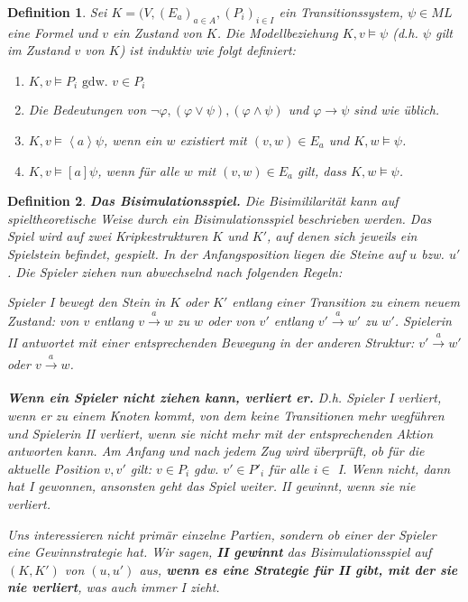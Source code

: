 \documentclass[12pt,a4paper]{article}
\newtheorem{defi}{Definition}[section]
\begin{document}
	\begin{defi}
	Sei $K = (V,(E_a)_{a\in A}, (P_i)_{i \in I}$ ein Transitionssystem,
$\psi \in ML$ eine Formel und $v$ ein Zustand von $K$. Die Modellbeziehung
$K, v \models \psi$ (d.h. $\psi$ gilt im Zustand $v$ von $K$) ist induktiv wie folgt definiert:
\begin{enumerate}
	\item $K,v \models P_i \text{ gdw. } v \in P_i$
	\item Die Bedeutungen von $\neg \varphi, (\varphi \lor \psi), (\varphi \land \psi)$ und $\varphi \rightarrow \psi $ sind wie üblich.
	\item $K,v \models \left\langle a \right\rangle \psi$, wenn ein $w$ existiert mit $(v,w) \in E_a$ und $K,w \models \psi$.
	\item $K,v \models \left[ a \right] \psi$, wenn für alle $w$ mit $(v,w) \in E_a$ gilt, dass $K,w \models \psi$.

\end{enumerate}
	\end{defi}
	
	\begin{defi}
	 \textbf{Das Bisimulationsspiel.} Die Bisimililarität kann auf spieltheoretische Weise durch ein Bisimulationsspiel beschrieben werden. Das Spiel wird auf zwei Kripkestrukturen
$K$ und $K'$, auf denen sich jeweils ein Spielstein befindet, gespielt. In der Anfangsposition liegen die Steine auf $u$ bzw. $u'$. Die Spieler ziehen nun abwechselnd nach folgenden Regeln:

Spieler I bewegt den Stein in $K$ oder $K'$ 
entlang einer Transition
zu einem neuem Zustand: von $v$ entlang $v \xrightarrow[]{a} w$ zu $w$ oder 
von $v'$ entlang $v' \xrightarrow[]{a} w'$ zu $w'$. 
Spielerin II antwortet mit einer entsprechenden
Bewegung in der anderen Struktur: $v' \xrightarrow[]{a} w'$ oder 
$v \xrightarrow[]{a} w$.

\textbf{Wenn ein Spieler nicht ziehen kann, verliert er.} D.h. Spieler I verliert, wenn er zu
einem Knoten kommt, von dem keine Transitionen mehr wegführen und
Spielerin II verliert, wenn sie nicht mehr mit der entsprechenden Aktion
antworten kann. Am Anfang und nach jedem Zug wird überprüft, ob
für die aktuelle Position $v, v'$ gilt: $v \in P_i$ gdw. $v' \in P'_i$
für alle $i \in $ I.
Wenn nicht, dann hat I gewonnen, ansonsten geht das Spiel weiter. II
gewinnt, wenn sie nie verliert.

Uns interessieren nicht primär einzelne Partien, sondern ob einer
der Spieler eine Gewinnstrategie hat. Wir sagen, \textbf{II gewinnt} das Bisimulationsspiel
auf $(K, K')$ von $(u, u')$ aus, \textbf{wenn es eine Strategie für
II gibt, mit der sie nie verliert}, was auch immer I zieht.
	\end{defi}
\end{document}
